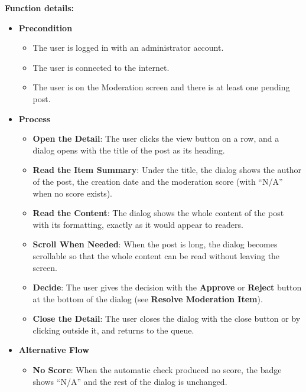 \textbf{Function details:}
\begin{itemize}[leftmargin=1.6em,topsep=4pt,itemsep=3pt,parsep=0pt,label=$\bullet$]
    \item \textbf{Precondition}
        \begin{itemize}[leftmargin=2.2em,topsep=2pt,itemsep=3pt,parsep=0pt,label=$\circ$]
            \item The user is logged in with an administrator account.
            \item The user is connected to the internet.
            \item The user is on the Moderation screen and there is at least one pending post.
        \end{itemize}
    \item \textbf{Process}
        \begin{itemize}[leftmargin=2.2em,topsep=2pt,itemsep=3pt,parsep=0pt,label=$\circ$]
            \item \textbf{Open the Detail}: The user clicks the view button on a row, and a dialog opens with the title of the post as its heading.
            \item \textbf{Read the Item Summary}: Under the title, the dialog shows the author of the post, the creation date and the moderation score (with ``N/A'' when no score exists).
            \item \textbf{Read the Content}: The dialog shows the whole content of the post with its formatting, exactly as it would appear to readers.
            \item \textbf{Scroll When Needed}: When the post is long, the dialog becomes scrollable so that the whole content can be read without leaving the screen.
            \item \textbf{Decide}: The user gives the decision with the \textbf{Approve} or \textbf{Reject} button at the bottom of the dialog (see \textbf{Resolve Moderation Item}).
            \item \textbf{Close the Detail}: The user closes the dialog with the close button or by clicking outside it, and returns to the queue.
        \end{itemize}
    \item \textbf{Alternative Flow}
        \begin{itemize}[leftmargin=2.2em,topsep=2pt,itemsep=3pt,parsep=0pt,label=$\circ$]
            \item \textbf{No Score}: When the automatic check produced no score, the badge shows ``N/A'' and the rest of the dialog is unchanged.

\end{itemize}
\end{itemize}
